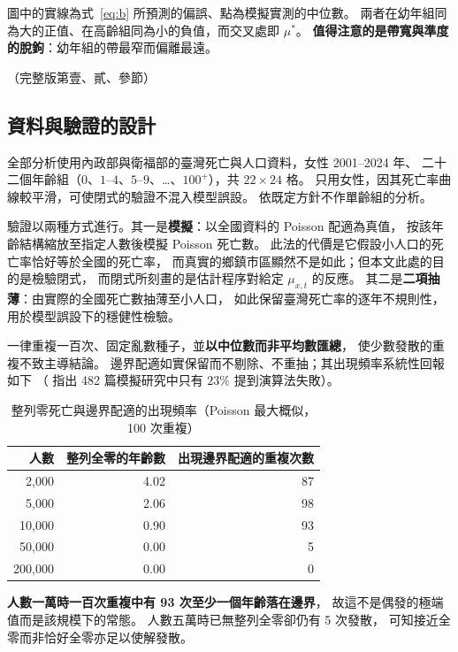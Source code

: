 \documentclass[UTF8, fontset=macnew, a4paper, 12pt]{ctexart}
\begin{document}
圖中的實線為式~\eqref{eq:b} 所預測的偏誤、點為模擬實測的中位數。
兩者在幼年組同為大的正值、在高齡組同為小的負值，而交叉處即 $\mu^{\ast}$。
\textbf{值得注意的是帶寬與準度的脫鉤}：幼年組的帶最窄而偏離最遠。

\noindent（完整版第壹、貳、參節）

\subsection{資料與驗證的設計}\label{ss:data}

全部分析使用內政部與衛福部的臺灣死亡與人口資料，女性 2001--2024 年、
二十二個年齡組（$0$、$1$--$4$、$5$--$9$、\ldots、$100^{+}$），共 $22\times24$ 格。
只用女性，因其死亡率曲線較平滑，可使閉式的驗證不混入模型誤設。
依既定方針不作單齡組的分析。

驗證以兩種方式進行。其一是\textbf{模擬}：以全國資料的 Poisson 配適為真值，
按該年齡結構縮放至指定人數後模擬 Poisson 死亡數。
此法的代價是它假設小人口的死亡率恰好等於全國的死亡率，
而真實的鄉鎮市區顯然不是如此；但本文此處的目的是檢驗閉式，
而閉式所刻畫的是估計程序對給定 $\mu_{x,t}$ 的反應。
其二是\textbf{二項抽薄}：由實際的全國死亡數抽薄至小人口，
如此保留臺灣死亡率的逐年不規則性，用於模型誤設下的穩健性檢驗。

一律重複一百次、固定亂數種子，並\textbf{以中位數而非平均數匯總}，
使少數發散的重複不致主導結論。
邊界配適如實保留而不剔除、不重抽；其出現頻率系統性回報如下
（\citealp{pawel2026} 指出 482 篇模擬研究中只有 $23\%$ 提到演算法失敗）。

\begin{table}[H]
\centering
\caption{整列零死亡與邊界配適的出現頻率（Poisson 最大概似，100 次重複）}
\small
\begin{tabular}{rrr}
\toprule
人數 & 整列全零的年齡數 & 出現邊界配適的重複次數\\
\midrule
2{,}000 & 4.02 & 87\\
5{,}000 & 2.06 & 98\\
10{,}000 & 0.90 & 93\\
50{,}000 & 0.00 & 5\\
200{,}000 & 0.00 & 0\\
\bottomrule
\end{tabular}
\label{t:bnd}
\end{table}

\textbf{人數一萬時一百次重複中有 93 次至少一個年齡落在邊界}，
故這不是偶發的極端值而是該規模下的常態。
人數五萬時已無整列全零卻仍有 5 次發散，
可知接近全零而非恰好全零亦足以使解發散。
\end{document}

